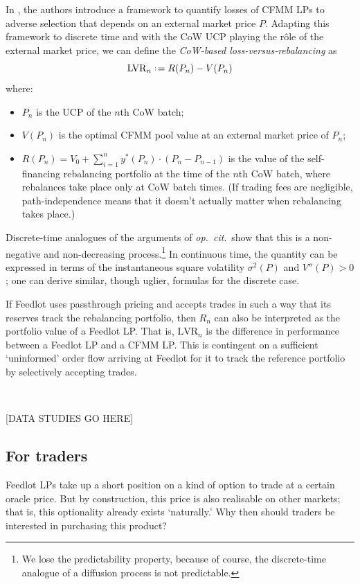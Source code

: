 \documentclass[a4paper,10pt]{article}
\theoremstyle{remark}
\newcommand{\defeq}{\mathrel{\vcenter{\hbox{\scriptsize:}}\!=}} %
\begin{document}
In \cite{milionis2022automated}, the authors introduce a framework to quantify losses of CFMM LPs to adverse selection that depends on an external market price $P$.
%
Adapting this framework to discrete time and with the CoW UCP playing the r\^ole of the external market price, we can define the \emph{CoW-based loss-versus-rebalancing} as
\[
  \mathrm{LVR}_n \defeq R(P_n) - V(P_n)
\]
where:
\begin{itemize}
  \item $P_n$ is the UCP of the $n$th CoW batch;
  \item $V(P_n)$ is the optimal CFMM pool value at an external market price of $P_n$;
  \item 
    $R(P_n) = V_0 + \sum_{i=1}^n y^*(P_n)\cdot (P_n-P_{n-1})$ is the value of the self-financing rebalancing portfolio at the time of the $n$th CoW batch, where rebalances take place only at CoW batch times.
    (If trading fees are negligible, path-independence means that it doesn't actually matter when rebalancing takes place.)
    
\end{itemize}
Discrete-time analogues of the arguments of \emph{op.~cit}.~show that this is a non-negative and non-decreasing process.\footnote{We lose the predictability property, because of course, the discrete-time analogue of a diffusion process is not predictable.} 
%
In continuous time, the quantity can be expressed in terms of the instantaneous square volatility $\sigma^2(P)$ and $V''(P)>0$; one can derive similar, though uglier, formulas for the discrete case.

If Feedlot uses passthrough pricing and accepts trades in such a way that its reserves track the rebalancing portfolio, then $R_n$ can also be interpreted as the portfolio value of a Feedlot LP.
%
That is, $\mathrm{LVR}_n$ is the difference in performance between a Feedlot LP and a CFMM LP.
%
This is contingent on a sufficient `uninformed' order flow arriving at Feedlot for it to track the reference portfolio by selectively accepting trades.

\

\begin{center}[DATA STUDIES GO HERE]\end{center}

\subsection{For traders}

Feedlot LPs take up a short position on a kind of option to trade at a certain oracle price. 
%
But by construction, this price is also realisable on other markets; that is, this optionality already exists `naturally.'
%
Why then should traders be interested in purchasing this product?
\end{document}
